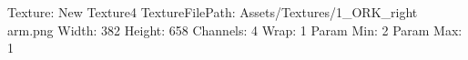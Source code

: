 Texture: New Texture4
TextureFilePath: Assets/Textures/1_ORK_right arm.png
Width: 382
Height: 658
Channels: 4
Wrap: 1
Param Min: 2
Param Max: 1